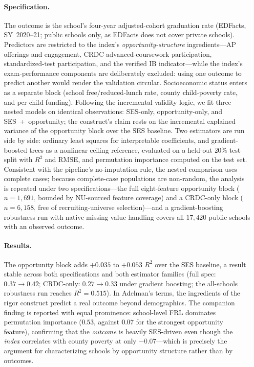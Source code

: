 \paragraph{Specification.}
The outcome is the school's four-year adjusted-cohort graduation rate (EDFacts, SY~2020--21;
public schools only, as EDFacts does not cover private schools). Predictors are restricted to
the index's \emph{opportunity-structure} ingredients---AP offerings and engagement, CRDC
advanced-coursework participation, standardized-test participation, and the verified IB
indicator---while the index's exam-performance components are deliberately excluded: using one
outcome to predict another would render the validation circular. Socioeconomic status enters
as a separate block (school free/reduced-lunch rate, county child-poverty rate, and per-child
funding). Following the incremental-validity logic, we fit three nested models on identical
observations: SES-only, opportunity-only, and SES~+~opportunity; the construct's claim rests
on the incremental explained variance of the opportunity block over the SES baseline. Two
estimators are run side by side: ordinary least squares for interpretable coefficients, and
gradient-boosted trees \citep{breiman2001} as a nonlinear ceiling reference, evaluated on a
held-out 20\% test split with $R^2$ and RMSE, and permutation importance computed on the test
set. Consistent with the pipeline's no-imputation rule, the nested comparison uses complete
cases; because complete-case populations are non-random, the analysis is repeated under two
specifications---the full eight-feature opportunity block ($n{=}1{,}691$, bounded by
NU-sourced feature coverage) and a CRDC-only block ($n{=}6{,}158$, free of
recruiting-universe selection)---and a gradient-boosting robustness run with native
missing-value handling covers all $17{,}420$ public schools with an observed outcome.

\paragraph{Results.}
The opportunity block adds $+0.035$ to $+0.053$ $R^2$ over the SES baseline, a result stable
across both specifications and both estimator families (full spec: $0.37 \rightarrow 0.42$;
CRDC-only: $0.27 \rightarrow 0.33$ under gradient boosting; the all-schools robustness run
reaches $R^2 = 0.515$). In Adelman's terms, the ingredients of the rigor construct predict a
real outcome beyond demographics. The companion finding is reported with equal prominence:
school-level FRL dominates permutation importance ($0.53$, against $0.07$ for the strongest
opportunity feature), confirming that the \emph{outcome} is heavily SES-driven even though
the \emph{index} correlates with county poverty at only $-0.07$---which is precisely the
argument for characterizing schools by opportunity structure rather than by outcomes.

